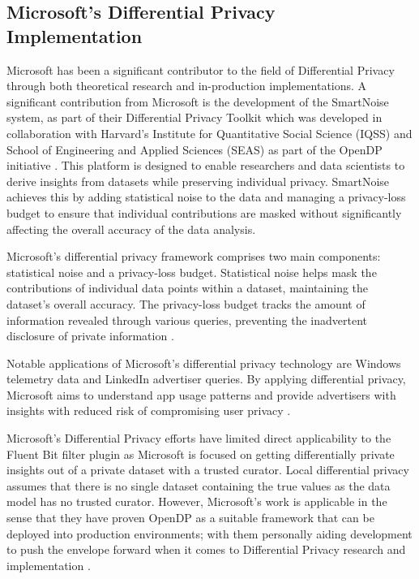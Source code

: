 \subsection{Microsoft's Differential Privacy Implementation}
Microsoft has been a significant contributor to the field of Differential Privacy through both theoretical research and in-production implementations. A significant contribution from Microsoft is the development of the SmartNoise system, as part of their Differential Privacy Toolkit which was developed in collaboration with Harvard's Institute for Quantitative Social Science (IQSS) and School of Engineering and Applied Sciences (SEAS) as part of the OpenDP initiative \cite{MicrosoftOpenDP, MicrosoftHarvardOpenDP}. This platform is designed to enable researchers and data scientists to derive insights from datasets while preserving individual privacy. SmartNoise achieves this by adding statistical noise to the data and managing a privacy-loss budget to ensure that individual contributions are masked without significantly affecting the overall accuracy of the data analysis.

Microsoft's differential privacy framework comprises two main components: statistical noise and a privacy-loss budget. Statistical noise helps mask the contributions of individual data points within a dataset, maintaining the dataset's overall accuracy. The privacy-loss budget tracks the amount of information revealed through various queries, preventing the inadvertent disclosure of private information \cite{MicrosoftDataResponsibly}.

Notable applications of Microsoft's differential privacy technology are Windows telemetry data and LinkedIn advertiser queries. By applying differential privacy, Microsoft aims to understand app usage patterns and provide advertisers with insights with reduced risk of compromising user privacy \cite{MicrosoftDataResponsibly}.

Microsoft's Differential Privacy efforts have limited direct applicability to the Fluent Bit filter plugin as Microsoft is focused on getting differentially private insights out of a private dataset with a trusted curator. Local differential privacy assumes that there is no single dataset containing the true values as the data model has no trusted curator. However, Microsoft's work is applicable in the sense that they have proven OpenDP as a suitable framework that can be deployed into production environments; with them personally aiding development to push the envelope forward when it comes to Differential Privacy research and implementation \cite{MicrosoftSmartNoise}.


